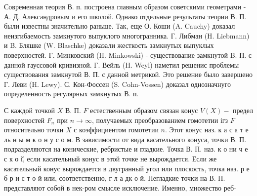 \documentclass[10pt]{article}
\begin{document}
Современная теория В. п. построена главным образом советскими геометрами - А. Д. Александровым и его школой. Однако отдельные результаты теории В. П. были известны значительно раньше. Так, еще О. Коши (A. Cauchy) доказал неизгибаемость замкнутого выпуклого многогранника. Г. Либман (H. Liebmann) и B. Бляшке (W. Blaschke) доказали жесткость замкнутых выпуклых поверхностей. Г. Минковский (H. Minkowski) - существование замкнутой B. П. с данной гауссовой кривизной. Г. Вейль (H. Weyl) наметил решенис проблемы существования замкнутой В. П. с данной метрикой. Это решение было завершено Г. Леви (H. Lewy). С. Кон-Фоссен (S. Cohn-Vossen) доказал однозначнуго определенность регулярных замкнутых В. п.



С каждой точкой $X$ В. П. $F$ естественным образом связан конус $V(X)-$ предел поверхностей $F_{n}$ при $n \rightarrow \infty$, получаемых преобразованием гомотетии ігз $F$ относительно точки $X$ с коэффициентом гомотетии $n$. Этот конус наз. к а с а т е ль н ы м к о н у с о м. В зависимости от вида касательного конуса, точки В. П. подразделяются на конические, ребристые и гладкие. Точка В. П. наз. к о ни ч е с к о і̆, если касательный конус в этой точке не вырождается. Если же касательный конус вырождается в двугранный угол или плоскость, точка наз. р е б р и с т о й или, соответственно, г л а дк о й. Негладкие точки на В. П. представляют собой в нек-ром смысле исключение. Именно, множество реб-
\end{document}
